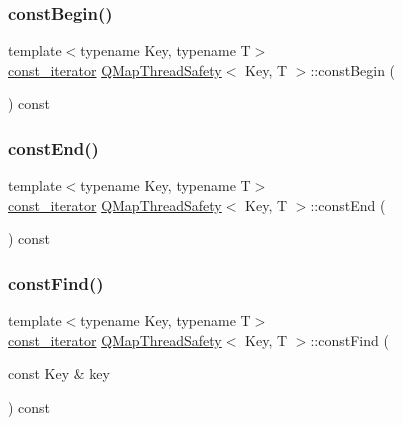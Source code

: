 \mbox{\label{class_q_map_thread_safety_a300f55a4c8e8ed3b5ccc2824dc18e60c}} 
\subsubsection{\texorpdfstring{const\+Begin()}{constBegin()}}
{\footnotesize\ttfamily template$<$typename Key, typename T$>$ \\
\hyperlink{class_q_map_thread_safety_aa58d8479729f72b33e305a4d0ca957bd}{const\+\_\+iterator} \hyperlink{class_q_map_thread_safety}{Q\+Map\+Thread\+Safety}$<$ Key, T $>$\+::const\+Begin (\begin{DoxyParamCaption}{ }\end{DoxyParamCaption}) const\hspace{0.3cm}{\ttfamily [inline]}}

\mbox{\label{class_q_map_thread_safety_aa98a2af8cafc423c6bc6a04fec106b39}} 
\subsubsection{\texorpdfstring{const\+End()}{constEnd()}}
{\footnotesize\ttfamily template$<$typename Key, typename T$>$ \\
\hyperlink{class_q_map_thread_safety_aa58d8479729f72b33e305a4d0ca957bd}{const\+\_\+iterator} \hyperlink{class_q_map_thread_safety}{Q\+Map\+Thread\+Safety}$<$ Key, T $>$\+::const\+End (\begin{DoxyParamCaption}{ }\end{DoxyParamCaption}) const\hspace{0.3cm}{\ttfamily [inline]}}

\mbox{\label{class_q_map_thread_safety_ac364cabf8837a0b174016656b6bda81b}} 
\subsubsection{\texorpdfstring{const\+Find()}{constFind()}}
{\footnotesize\ttfamily template$<$typename Key, typename T$>$ \\
\hyperlink{class_q_map_thread_safety_aa58d8479729f72b33e305a4d0ca957bd}{const\+\_\+iterator} \hyperlink{class_q_map_thread_safety}{Q\+Map\+Thread\+Safety}$<$ Key, T $>$\+::const\+Find (\begin{DoxyParamCaption}\item[{const Key \&}]{key }\end{DoxyParamCaption}) const\hspace{0.3cm}{\ttfamily [inline]}}

